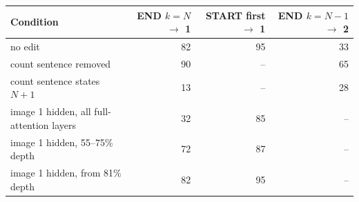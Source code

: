\begin{tabular}{lrrr}
\toprule
Condition & END $k=N$ $\to$ 1 & START first $\to$ 1 & END $k=N-1$ $\to$ 2 \\
\midrule
no edit & 82 & 95 & 33 \\
count sentence removed & 90 & -- & 65 \\
count sentence states $N+1$ & 13 & -- & 28 \\
image 1 hidden, all full-attention layers & 32 & 85 & -- \\
image 1 hidden, 55--75\% depth & 72 & 87 & -- \\
image 1 hidden, from 81\% depth & 82 & 95 & -- \\
\bottomrule
\end{tabular}

